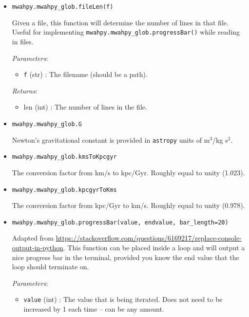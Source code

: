 \documentclass{article}
\begin{document}
\begin{itemize}

\item \verb!mwahpy.mwahpy_glob.fileLen(f)!

Given a file, this function will determine the number of lines in that file. Useful for implementing \verb!mwahpy.mwahpy_glob.progressBar()! while reading in files. 

\textit{Parameters}: \begin{itemize}

\item \verb!f! (str) : The filename (should be a path).

\end{itemize}

\textit{Returns}: \begin{itemize} 

\item len (int) : The number of lines in the file. 

\end{itemize}




\item \verb!mwahpy.mwahpy_glob.G!

Newton's gravitational constant is provided in \verb!astropy! units of m$^3$/kg s$^2$.

\item \verb!mwahpy.mwahpy_glob.kmsToKpcgyr!

The conversion factor from km/s to kpc/Gyr. Roughly equal to unity (1.023).

\item \verb!mwahpy.mwahpy_glob.kpcgyrToKms!

The conversion factor from kpc/Gyr to km/s. Roughly equal to unity (0.978).



\item \verb!mwahpy.mwahpy_glob.progressBar(value, endvalue, bar_length=20)!

Adapted from \url{https://stackoverflow.com/questions/6169217/replace-console-output-in-python}. This function can be placed inside a loop and will output a nice progress bar in the terminal, provided you know the end value that the loop should terminate on. 

\textit{Parameters}: \begin{itemize}

\item \verb!value! (int) : The value that is being iterated. Does not need to be increased by 1 each time -- can be any amount. 


\end{itemize}
\end{itemize}
\end{document}
